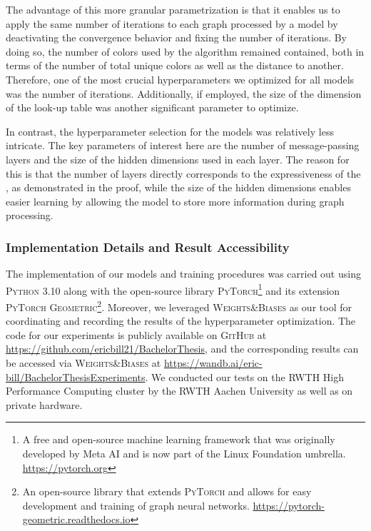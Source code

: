 The advantage of this more granular parametrization is that it enables us to apply the same number of \wl iterations to each graph processed by a \wlnn model by deactivating the convergence behavior and fixing the number of iterations. By doing so, the number of colors used by the \wl algorithm remained contained, both in terms of the number of total unique colors as well as the distance to another. Therefore, one of the most crucial hyperparameters we optimized for all \wlnn models was the number of \wl iterations. Additionally, if employed, the size of the dimension of the look-up table was another significant parameter to optimize.

In contrast, the hyperparameter selection for the \gnn models was relatively less intricate. The key parameters of interest here are the number of message-passing layers and the size of the hidden dimensions used in each layer. The reason for this is that the number of layers directly corresponds to the expressiveness of the \gnn, as demonstrated in the proof, while the size of the hidden dimensions enables easier learning by allowing the model to store more information during graph processing.

\subsubsection{Implementation Details and Result Accessibility}
The implementation of our models and training procedures was carried out using \textsc{Python 3.10} along with the open-source library \textsc{PyTorch}\footnote{A free and open-source machine learning framework that was originally developed by Meta AI and is now part of the Linux Foundation umbrella. \href{https://pytorch.org}{https://pytorch.org}} and its extension \textsc{PyTorch Geometric}\footnote{An open-source library that extends \textsc{PyTorch} and allows for easy development and training of graph neural networks. \href{https://pytorch-geometric.readthedocs.io/en/latest}{https://pytorch-geometric.readthedocs.io}}. Moreover, we leveraged \textsc{Weights\&Biases} as our tool for coordinating and recording the results of the hyperparameter optimization. The code for our experiments is publicly available on \textsc{GitHub} at \url{https://github.com/ericbill21/BachelorThesis}, and the corresponding results can be accessed via \textsc{Weights\&Biases} at \url{https://wandb.ai/eric-bill/BachelorThesisExperiments}. We conducted our tests on the RWTH High Performance Computing cluster by the RWTH Aachen University as well as on private hardware.

